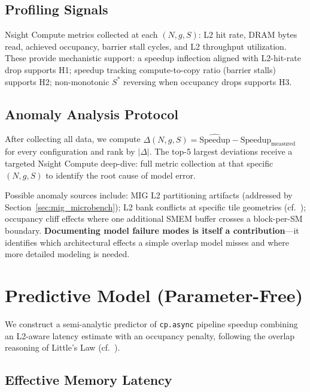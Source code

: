 \documentclass[sigplan,nonacm,10pt]{acmart}
\begin{document}
\subsection{Profiling Signals}

Nsight Compute metrics collected at each $(N, g, S)$:
L2 hit rate, DRAM bytes read, achieved occupancy, barrier stall cycles,
and L2 throughput utilization.
These provide mechanistic support: a speedup inflection aligned with
L2-hit-rate drop supports H1; speedup tracking compute-to-copy ratio
(barrier stalls) supports H2; non-monotonic $S^*$ reversing when
occupancy drops supports H3.

\subsection{Anomaly Analysis Protocol}
\label{sec:anomaly}

After collecting all data, we compute
$\Delta(N,g,S) = \widehat{\text{Speedup}} - \text{Speedup}_{\text{measured}}$
for every configuration and rank by $|\Delta|$.
The top-5 largest deviations receive a targeted Nsight Compute
deep-dive: full metric collection at that specific $(N,g,S)$ to
identify the root cause of model error.

Possible anomaly sources include:
MIG L2 partitioning artifacts (addressed by
Section~\ref{sec:mig_microbench});
L2 bank conflicts at specific tile geometries (cf.~\cite{gpu_noc});
occupancy cliff effects where one additional SMEM buffer crosses a
block-per-SM boundary.
\textbf{Documenting model failure modes is itself a contribution}---it
identifies which architectural effects a simple overlap model misses
and where more detailed modeling is needed.

\section{Predictive Model (Parameter-Free)}
\label{sec:model}

We construct a semi-analytic predictor of \texttt{cp.async} pipeline
speedup combining an L2-aware latency estimate with an occupancy
penalty, following the overlap reasoning of Little's Law
(cf.~\cite{acta}).

\subsection{Effective Memory Latency}
\end{document}
